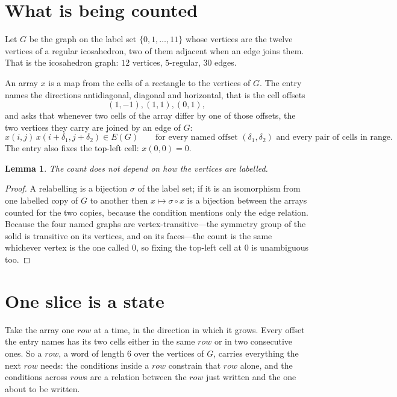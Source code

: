\documentclass[11pt,a4paper]{article}
\theoremstyle{plain}
\newtheorem{lemma}[theorem]{Lemma}
\theoremstyle{definition}
\begin{document}
\section{What is being counted}

Let $G$ be the graph on the label set $\{0,1,\dots,11\}$ whose vertices are the twelve vertices of a regular icosahedron, two of them adjacent when an edge joins them. That is the icosahedron graph: $12$ vertices, $5$-regular, $30$ edges.

An array $x$ is a map from the cells of a rectangle to the vertices of $G$. The entry names the
directions antidiagonal, diagonal and horizontal, that is the cell offsets
\[
(1,-1), (1,1), (0,1),
\]
and asks that whenever two cells of the array differ by one of those offsets, the two vertices
they carry are joined by an edge of $G$:
\[
x(i,j)\,x(i+\delta_1,j+\delta_2)\in E(G)\qquad
\text{for every named offset } (\delta_1,\delta_2)\text{ and every pair of cells in range.}
\]
The entry also fixes the top-left cell: $x(0,0)=0$.

\begin{lemma}\label{lem:label}
The count does not depend on how the vertices are labelled.
\end{lemma}

\begin{proof}
A relabelling is a bijection $\sigma$ of the label set; if it is an isomorphism from one
labelled copy of $G$ to another then $x\mapsto\sigma\circ x$ is a bijection between the arrays
counted for the two copies, because the condition mentions only the edge relation.
Because the four named graphs are vertex-transitive---the symmetry group of the solid is transitive on its vertices, and on its faces---the count is the same whichever vertex is the one called $0$, so fixing the top-left cell at $0$ is unambiguous too.
\end{proof}

\section{One slice is a state}

Take the array one $row$ at a time, in the direction in which it grows.
Every offset the entry names has its two cells either in the same $row$ or in two
consecutive ones. So a $row$, a word of length $6$ over the vertices of $G$, carries
everything the next $row$ needs: the conditions inside a $row$ constrain that
$row$ alone, and the conditions across $row$s are a relation between the
$row$ just written and the one about to be written.
\end{document}
